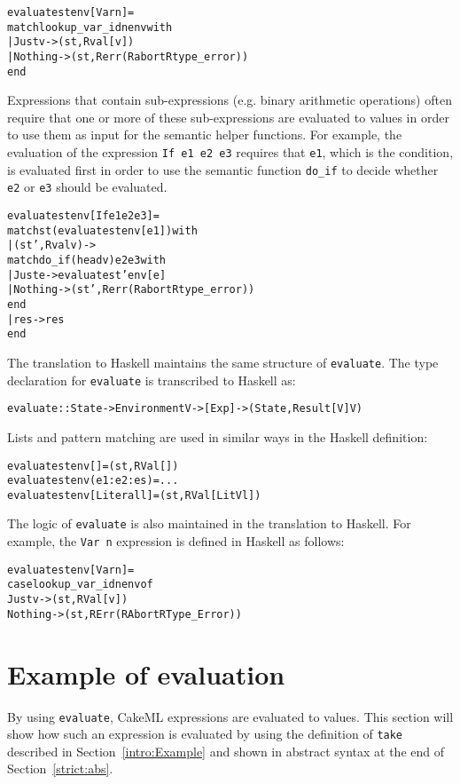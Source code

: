 \begin{alltt}
  evaluate st env [Var n] =
    match lookup_var_id n env with
    | Just v -> (st, Rval [v])
    | Nothing -> (st, Rerr (Rabort Rtype_error))
    end
\end{alltt}

\noindent Expressions that contain sub-expressions (e.g. binary arithmetic
operations) often require that one or more of these sub-expressions are
evaluated to values in order to use them as input for the semantic helper
functions. For example, the evaluation of the expression \texttt{If e1 e2 e3}
requires that
\texttt{e1}, which is the condition, is evaluated first in order to use the
semantic function \texttt{do\_if} to decide whether \texttt{e2} or
\texttt{e3} should be evaluated.

\begin{alltt}
  evaluate st env [If e1 e2 e3] =
    match st (evaluate st env [e1]) with
    | (st', Rval v) ->
        match do_if (head v) e2 e3 with
        | Just e -> evaluate st' env [e]
        | Nothing -> (st', Rerr (Rabort Rtype_error))
        end
    | res -> res
    end
\end{alltt}

The translation to Haskell maintains the same structure of \texttt{evaluate}.
The type declaration for \texttt{evaluate} is transcribed to Haskell as:
\begin{alltt}
  evaluate :: State -> Environment V -> [Exp] -> (State, Result [V] V)
\end{alltt}

\noindent Lists and pattern matching are used in similar ways in the Haskell definition:

\begin{alltt}
  evaluate st env []          = (st, RVal [])
  evaluate st env (e1:e2:es)  = ...
  evaluate st env [Literal l] = (st, RVal [LitV l])
\end{alltt}

\noindent The logic of \texttt{evaluate} is also maintained in the translation
to Haskell. For example, the \texttt{Var n} expression is defined in Haskell as
follows:
\newpage
\begin{alltt}
  evaluate st env [Var n] =
    case lookup_var_id n env of
      Just v  -> (st, RVal [v])
      Nothing -> (st, RErr (RAbort RType_Error))
\end{alltt}

\section{Example of evaluation}
\label{strict:example}
By using \texttt{evaluate}, CakeML expressions are evaluated to values. This
section will show how such an expression is evaluated by using the definition of
\texttt{take} described in Section~\ref{intro:Example} and shown in abstract
syntax at the end of Section~\ref{strict:abs}.

